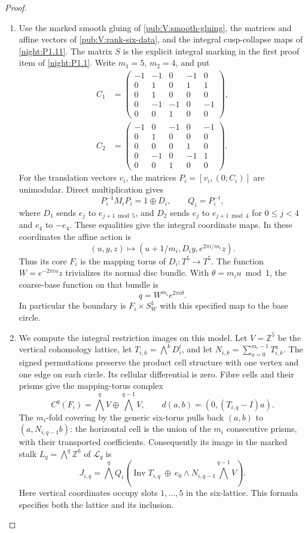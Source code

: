 \documentclass[11pt,a4paper]{article}
\numberwithin{equation}{section}
\theoremstyle{definition}
\begin{document}
\begin{proof}
\begin{enumerate}[label=\arabic*.,leftmargin=*]
\item Use the marked smooth gluing of
\cref{pub:V:smooth-gluing}, the matrices and affine vectors of
\cref{pub:V:rank-six-data}, and the integral cusp-collapse maps
of \cref{night:P1.11}. The matrix $S$ is the explicit integral
marking in the first proof item of \cref{night:P1.1}.
Write
$m_1=5$, $m_2=4$, and put
\[
\begin{split}
C_1&=\begin{pmatrix}
-1&-1&0&-1&0\\0&1&0&1&1\\0&1&0&0&0\\
0&-1&-1&0&-1\\0&0&1&0&0
\end{pmatrix},\\[2pt]
C_2&=\begin{pmatrix}
-1&0&-1&0&-1\\0&1&0&0&0\\0&0&0&1&0\\
0&-1&0&-1&1\\0&0&1&0&0
\end{pmatrix}.
\end{split}
\]
For the translation vectors $v_i$, the matrices
$P_i=[v_i,(0;C_i)]$ are unimodular.  Direct multiplication gives
\[
 P_i^{-1}M_iP_i=1\oplus D_i,\qquad Q_i=P_i^{-t},
\]
where $D_1$ sends $e_j$ to $e_{j+1\bmod5}$, and $D_2$ sends
$e_j$ to $e_{j+1\bmod4}$ for $0\le j<4$ and $e_4$ to $-e_4$.
These equalities give the integral coordinate maps.  In these
coordinates the affine action is
\[
 (u,y,z)\longmapsto
 (u+1/m_i,D_i y,e^{2\pi i/m_i}z).
\]
Thus its core $F_i$ is the mapping torus of $D_i:T^5\to T^5$.
The function $W=e^{-2\pi i u}z$ trivializes its normal disc bundle.
With $\theta=m_i u\bmod1$, the coarse-base function on that bundle is
\[
                  q=W^{m_i}e^{2\pi i\theta}.
\]
In particular the boundary is $F_i\times S^1_W$ with this specified
map to the base circle.

\item We compute the integral restriction images on this model.
Let $V=\mathbb Z^5$ be the vertical cohomology lattice, let
$T_{i,k}=\bigwedge^kD_i^t$, and let
$N_{i,k}=\sum_{a=0}^{m_i-1}T_{i,k}^{a}$.
The signed permutations preserve the product cell structure with one
vertex and one edge on each circle.  Its cellular differential is zero.
Fibre cells and their prisms give the mapping-torus complex
\[
 C^q(F_i)=\bigwedge^qV\oplus\bigwedge^{q-1}V,
 \qquad d(a,b)=(0,(T_{i,q}-I)a).
\]
The $m_i$-fold covering by the generic six-torus pulls back
$(a,b)$ to $(a,N_{i,q-1}b)$: the horizontal cell is the union of the
$m_i$ consecutive prisms, with their transported coefficients.
Consequently its image in the marked stalk
$L_q=\bigwedge^q\mathbb Z^6$ of $\mathcal L_q$ is
\[
 J_{i,q}=\bigwedge^q Q_i
 \left(\operatorname{Inv}T_{i,q}\ \oplus\
 e_0\wedge N_{i,q-1}\bigwedge^{q-1}V\right).
\]
Here vertical coordinates occupy slots $1,\ldots,5$ in the six-lattice.
This formula specifies both the lattice and its inclusion.


\end{enumerate}
\end{proof}
\end{document}
